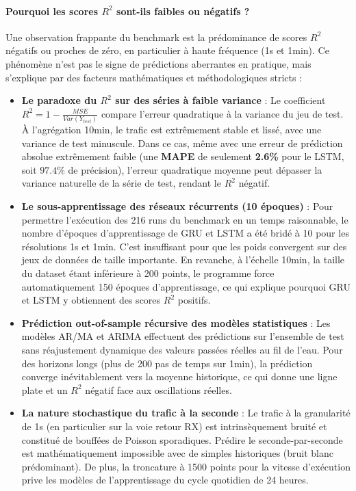 \documentclass[11pt,a4paper]{article}
\begin{document}
\paragraph{Pourquoi les scores $R^2$ sont-ils faibles ou négatifs ?}
Une observation frappante du benchmark est la prédominance de scores $R^2$ négatifs ou proches de zéro, en particulier à haute fréquence (1s et 1min). Ce phénomène n'est pas le signe de prédictions aberrantes en pratique, mais s'explique par des facteurs mathématiques et méthodologiques stricts :
\begin{itemize}
    \item \textbf{Le paradoxe du $R^2$ sur des séries à faible variance} : Le coefficient $R^2 = 1 - \frac{MSE}{Var(Y_{test})}$ compare l'erreur quadratique à la variance du jeu de test. À l'agrégation 10min, le trafic est extrêmement stable et lissé, avec une variance de test minuscule. Dans ce cas, même avec une erreur de prédiction absolue extrêmement faible (une \textbf{MAPE} de seulement \textbf{2.6\%} pour le LSTM, soit $97.4\%$ de précision), l'erreur quadratique moyenne peut dépasser la variance naturelle de la série de test, rendant le $R^2$ négatif.
    \item \textbf{Le sous-apprentissage des réseaux récurrents (10 époques)} : Pour permettre l'exécution des 216 runs du benchmark en un temps raisonnable, le nombre d'époques d'apprentissage de GRU et LSTM a été bridé à 10 pour les résolutions 1s et 1min. C'est insuffisant pour que les poids convergent sur des jeux de données de taille importante. En revanche, à l'échelle 10min, la taille du dataset étant inférieure à 200 points, le programme force automatiquement 150 époques d'apprentissage, ce qui explique pourquoi GRU et LSTM y obtiennent des scores $R^2$ positifs.
    \item \textbf{Prédiction out-of-sample récursive des modèles statistiques} : Les modèles AR/MA et ARIMA effectuent des prédictions sur l'ensemble de test sans réajustement dynamique des valeurs passées réelles au fil de l'eau. Pour des horizons longs (plus de 200 pas de temps sur 1min), la prédiction converge inévitablement vers la moyenne historique, ce qui donne une ligne plate et un $R^2$ négatif face aux oscillations réelles.
    \item \textbf{La nature stochastique du trafic à la seconde} : Le trafic à la granularité de 1s (en particulier sur la voie retour RX) est intrinsèquement bruité et constitué de bouffées de Poisson sporadiques. Prédire le seconde-par-seconde est mathématiquement impossible avec de simples historiques (bruit blanc prédominant). De plus, la troncature à 1500 points pour la vitesse d'exécution prive les modèles de l'apprentissage du cycle quotidien de 24 heures.
\end{itemize}
\end{document}
